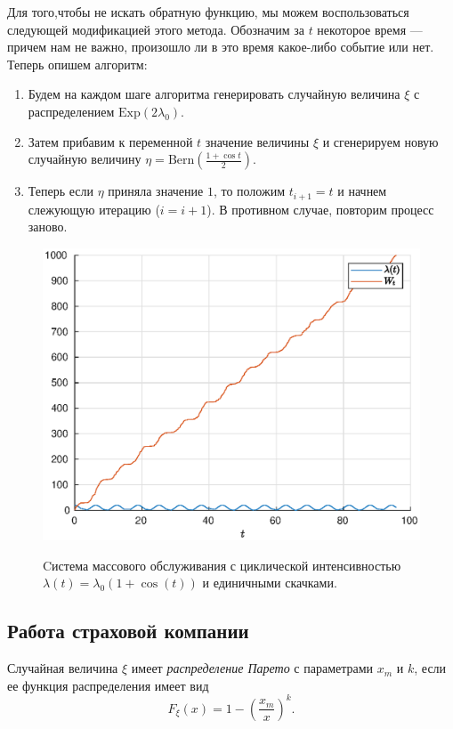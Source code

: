 Для того,чтобы не искать обратную функцию, мы можем воспользоваться следующей модификацией этого метода. Обозначим за $t$ некоторое время --- причем нам не важно, произошло ли в это время какое-либо событие или нет. Теперь опишем алгоритм:
\begin{enumerate}
        \item Будем на каждом шаге алгоритма генерировать случайную величина $\xi$ с распределением $\mathrm{Exp}(2\lambda_0)$.
        \item Затем прибавим к переменной $t$ значение величины $\xi$ и сгенерируем новую случайную величину $\eta = \mathrm{Bern}\left(\frac{1 + \cos t}{2}\right)$.
        \item Теперь если $\eta$ приняла значение $1$, то положим $t_{i+1} = t$ и начнем слежующую итерацию ($i = i+1$). В противном случае, повторим процесс заново.
\end{enumerate}

\begin{figure}[h]
\noindent
        \centering
        {
        \includegraphics[width=120mm]{task_11/2.eps}}
        \caption{Cистема массового обслуживания с циклической интенсивностью $\lambda(t) = \lambda_0 (1 + \cos(t))$ и единичными скачками.}
\end{figure}


\subsection{Работа страховой компании}

\begin{definition}
        Случайная величина $\xi$ имеет \textit{распределение Парето} с параметрами $x_m$ и $k$, если ее функция распределения имеет вид
$$
        F_{\xi}(x) = 1 - \left(\frac{x_m}{x}\right)^k.
$$
\end{definition}

